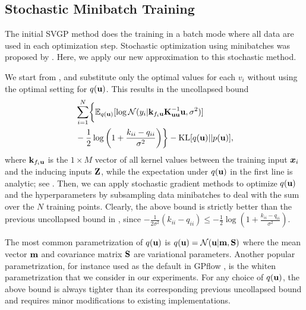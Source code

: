 \subsection{Stochastic Minibatch Training
\label{sec:stochasticopt}}

The initial SVGP method \cite{titsias2009variational} does the training in a batch mode where all data are used in each optimization step. Stochastic optimization using minibatches was proposed by \citet{hensman2013gaussian}.  
Here, we apply our new approximation to this stochastic method. 

We start from  ,
and substitute only the optimal values for each $v_i$
without using the optimal setting for $q(\textbf{u})$. This results in the uncollapsed
bound
\begin{align} 
& \sum_{i=1}^N \biggl\{  \mathbb{E}_{q(\textbf{u})} [\log \mathcal{N}(y_i | \textbf{k}_{f_i \textbf{u}}
\textbf{K}_{\textbf{u} \textbf{u} }^{-1} \textbf{u}, \sigma^2 )]  \nonumber \\
& - \frac{1}{2}  \log\left(1+\frac{k_{ii} - q_{ii}}{\sigma^2} \right)  \biggr\} 
  - \text{KL}[q(\textbf{u}) || p(\textbf{u})],
\label{eq:newuncollapsedbound}
\end{align}
where  $\textbf{k}_{f_i \textbf{u}}$ is the $1 \times M$ vector of all kernel 
values between the training input $\boldsymbol{x}_i$ and the inducing inputs $\textbf{Z}$, while 
the expectation under $q(\textbf{u})$ in the first line is 
analytic; see \citet{hensman2013gaussian}. %
Then, we can apply stochastic gradient methods to optimize 
$q(\textbf{u})$ and the hyperparameters  by subsampling 
data minibatches to deal with the  sum over the $N$ training points.  
Clearly, the above bound is strictly better than 
the previous uncollapsed bound in \citet{hensman2013gaussian},
since $- \frac{1}{2 \sigma^2} (k_{ii} - q_{ii}) \leq -\frac{1}{2} \log\left(1 + \frac{k_{ii} - q_{ii}}{\sigma^2} \right)$. 

The most common parametrization of $q(\textbf{u})$
is $q(\textbf{u}) = \mathcal{N}(\textbf{u} | \textbf{m}, \textbf{S})$ where  the mean vector $\textbf{m}$ and covariance matrix $\textbf{S}$ are    
variational parameters.  Another popular 
parametrization, for instance used as the default in GPflow \cite{GPflow17}, is the whiten 
parametrization that we consider in our experiments. %
For any choice of
$q(\textbf{u})$,  the above bound is always tighter than its corresponding 
 previous uncollapsed bound and requires minor modifications to existing 
 implementations.
        

